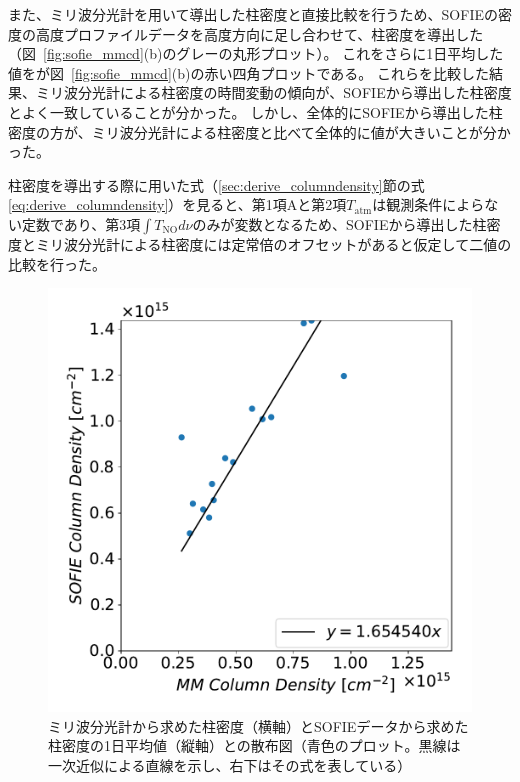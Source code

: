 また、ミリ波分光計を用いて導出した柱密度と直接比較を行うため、SOFIEの密度の高度プロファイルデータを高度方向に足し合わせて、柱密度を導出した（図~\ref{fig:sofie_mmcd}(b)のグレーの丸形プロット）。
これをさらに1日平均した値をが図~\ref{fig:sofie_mmcd}(b)の赤い四角プロットである。
これらを比較した結果、ミリ波分光計による柱密度の時間変動の傾向が、SOFIEから導出した柱密度とよく一致していることが分かった。
しかし、全体的にSOFIEから導出した柱密度の方が、ミリ波分光計による柱密度と比べて全体的に値が大きいことが分かった。\par

柱密度を導出する際に用いた式（\ref{sec:derive_columndensity}節の式\eqref{eq:derive_columndensity}）を見ると、第1項$\mathrm{A}$と第2項$T_{\mathrm{atm}}$は観測条件によらない定数であり、第3項$\int T_{\mathrm{NO}}d\nu$のみが変数となるため、SOFIEから導出した柱密度とミリ波分光計による柱密度には定常倍のオフセットがあると仮定して二値の比較を行った。
\begin{figure}[htbp]
    \centering
    \includegraphics[scale=0.5]{master_thesis_contents/master_thesis_fig/sofie_mmcd_sofiecd_corr.pdf}
    \caption{ミリ波分光計から求めた柱密度（横軸）とSOFIEデータから求めた柱密度の1日平均値（縦軸）との散布図（青色のプロット。黒線は一次近似による直線を示し、右下はその式を表している）}
    \label{fig:sofie_mmcd_sofiecd_corr}
\end{figure}
